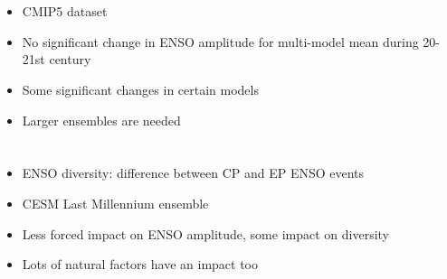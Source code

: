 \documentclass[11pt]{article}
\begin{document}
\section{\cite{stevenson2012significant}}
\label{sec:orgc796e1b}

\begin{itemize}
\item CMIP5 dataset
\item No significant change in ENSO amplitude for multi-model mean during 20-21st century
\item Some significant changes in certain models
\item Larger ensembles are needed
\end{itemize}

\section{\cite{stevenson2017forced}}
\label{sec:orgcf41ef7}

\begin{itemize}
\item ENSO diversity: difference between CP and EP ENSO events
\item CESM Last Millennium ensemble
\item Less forced impact on ENSO amplitude, some impact on diversity
\item Lots of natural factors have an impact too
\end{itemize}

\section{\cite{torrence1998practical}}
\label{sec:org1dc9592}
\end{document}
